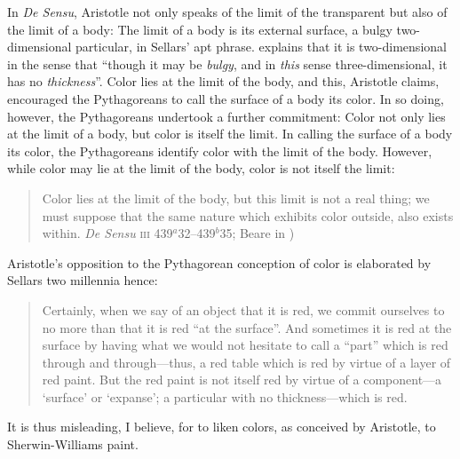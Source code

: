 \documentclass[12pt]{article}
\begin{document}
In \emph{De Sensu}, Aristotle not only speaks of the limit of the transparent but also of the limit of a body: The limit of a body is its external surface, a bulgy two-dimensional particular, in Sellars' \citeyearpar[\textsc{iv} 23]{Sellars:1956xp} apt phrase. \citet[\textsc{iv} 23]{Sellars:1956xp} explains that it is two-dimensional in the sense that ``though it may be \emph{bulgy}, and in \emph{this} sense three-dimensional, it has no \emph{thickness}''. Color lies at the limit of the body, and this, Aristotle claims, encouraged the Pythagoreans to call the surface of a body its color. In so doing, however, the Pythagoreans undertook a further commitment: Color not only lies at the limit of a body, but color is itself the limit. In calling the surface of a body its color, the Pythagoreans identify color with the limit of the body. However, while color may lie at the limit of the body, color is not itself the limit:
\begin{quote}
	Color lies at the limit of the body, but this limit is not a real thing; we must suppose that the same nature which exhibits color outside, also exists within. \emph{De Sensu} \textsc{iii} 439\( ^{a} \)32--439\( ^{b} \)35; Beare in \citealt[7]{Barnes:1984uq})
\end{quote}
Aristotle's opposition to the Pythagorean conception of color is elaborated by Sellars two millennia hence:
\begin{quote}
	Certainly, when we say of an object that it is red, we commit ourselves to no more than that it is red ``at the surface''. And sometimes it is red at the surface by having what we would not hesitate to call a ``part'' which is red through and through---thus, a red table which is red by virtue of a layer of red paint. But the red paint is not itself red by virtue of a component---a `surface' or `expanse'; a particular with no thickness---which is red. \citep[\textsc{iv} 23]{Sellars:1956xp}
\end{quote}
It is thus misleading, I believe, for \citet{Silverman:1989ve} to liken colors, as conceived by Aristotle, to Sherwin-Williams paint.
\end{document}
